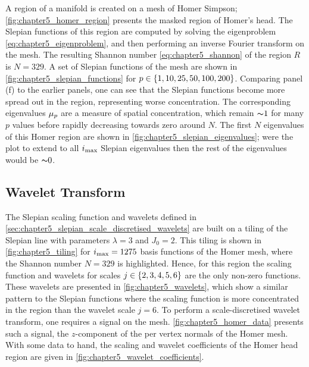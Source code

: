 A region of a manifold is created on a mesh of Homer Simpson; \cref{fig:chapter5_homer_region} presents the masked region of Homer's head.
The Slepian functions of this region are computed by solving the eigenproblem \cref{eq:chapter5_eigenproblem}, and then performing an inverse Fourier transform on the mesh.
The resulting Shannon number \cref{eq:chapter5_shannon} of the region \(R\) is \(N=329\).
A set of Slepian functions of the mesh are shown in \cref{fig:chapter5_slepian_functions} for \(p \in \{1, 10, 25, 50, 100, 200\}\).
Comparing panel (f) to the earlier panels, one can see that the Slepian functions become more spread out in the region, representing worse concentration.
The corresponding eigenvalues \({\mu}_{p}\) are a measure of spatial concentration, which remain \({\thicksim}1\) for many \(p\) values before rapidly decreasing towards zero around \(N\).
The first \(N\) eigenvalues of this Homer region are shown in \cref{fig:chapter5_slepian_eigenvalues}; were the plot to extend to all \(i_{\text{max}}{}\) Slepian eigenvalues then the rest of the eigenvalues would be \({\thicksim}0\).







\subsection{Wavelet Transform}\label{sec:chapter5_wavelet_transform}

The Slepian scaling function and wavelets defined in \cref{sec:chapter5_slepian_scale_discretised_wavelets} are built on a tiling of the Slepian line with parameters \(\lambda=3\) and \(J_{0}=2\).
This tiling is shown in \cref{fig:chapter5_tiling} for \(i_{\text{max}}=\num{1275}\) basis functions of the Homer mesh, where the Shannon number \(N=329\) is highlighted.
Hence, for this region the scaling function and wavelets for scales \(j \in \{2, 3, 4, 5, 6\}\) are the only non-zero functions.
These wavelets are presented in \cref{fig:chapter5_wavelets}, which show a similar pattern to the Slepian functions where the scaling function is more concentrated in the region than the wavelet scale \(j=6\).
To perform a scale-discretised wavelet transform, one requires a signal on the mesh.
\cref{fig:chapter5_homer_data} presents such a signal, the \(z\)-component of the per vertex normals of the Homer mesh.
With some data to hand, the scaling and wavelet coefficients of the Homer head region are given in \cref{fig:chapter5_wavelet_coefficients}.

